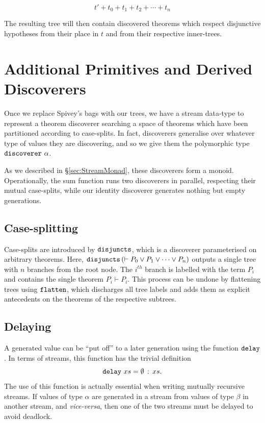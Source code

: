 \begin{displaymath}
t' + t_0 + t_1 + t_2 + \cdots + t_n
\end{displaymath}

The resulting tree will then contain discovered theorems which respect disjunctive hypotheses from their place in $t$ and from their respective inner-trees.

\section{Additional Primitives and Derived Discoverers}\label{sec:Additional}
Once we replace Spivey's bags with our trees, we have a stream data-type to represent a theorem discoverer searching a space of theorems which have been partitioned according to case-splits. In fact, discoverers generalise over whatever type of values they are discovering, and so we give them the polymorphic type $\texttt{discoverer}\ \alpha$.  

As we described in \S\ref{sec:StreamMonad}, these discoverers form a monoid. Operationally, the sum function runs two discoverers in parallel, respecting their mutual case-splits, while our identity discoverer generates nothing but empty generations.

\subsection{Case-splitting}
Case-splits are introduced by $\texttt{disjuncts}$, which is a discoverer parameterised on arbitrary theorems. Here, $\texttt{disjuncts}\left(\vdash P_0 \vee P_1 \vee \cdots \vee P_n\right)$ outputs a single tree with $n$ branches from the root node. The $i^{th}$ branch is labelled with the term $P_i$ and contains the single theorem $P_i \vdash P_i$. This process can be undone by flattening trees using $\texttt{flatten}$, which discharges all tree labels and adds them as explicit antecedents on the theorems of the respective subtrees.

\subsection{Delaying}
A generated value can be ``put off'' to a later generation using the function $\texttt{delay}$. In terms of streams, this function has the trivial definition
\begin{displaymath}
  \texttt{delay}\ xs = \emptyset\,:\,xs.
\end{displaymath}
The use of this function is actually essential when writing mutually recursive streams. If values of type $\alpha$ are generated in a stream from values of type $\beta$ in another stream, and \emph{vice-versa}, then one of the two streams must be delayed to avoid deadlock.

